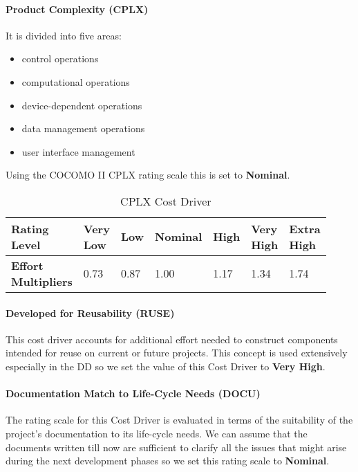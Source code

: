 \paragraph{Product Complexity (CPLX)} It is divided into five areas:
\begin{itemize}
	\item control operations
	\item computational operations
	\item device-dependent operations
	\item data management operations
	\item user interface management
\end{itemize}
Using the COCOMO II CPLX rating scale this is set to \textbf{Nominal}. 
\begin{table}[H]
	\centering
	\begin{tabular}{|M{0.165\linewidth}|M{0.125\linewidth}|M{0.125\linewidth}|M{0.125\linewidth}|M{0.125\linewidth}|M{0.125\linewidth}|M{0.125\linewidth}|}
		\hline
		\textbf{Rating Level} & Very Low & Low & Nominal & High & Very High & Extra High \\
		\hline
		\textbf{Effort Multipliers} & 0.73 & 0.87 & 1.00 & 1.17 & 1.34 & 1.74 \\
		\hline
	\end{tabular}
	\caption{CPLX Cost Driver}
\end{table}

\paragraph{Developed for Reusability (RUSE)} This cost driver accounts for additional effort needed to construct components intended for reuse on current or future projects. This concept is used extensively especially in the DD so we set the value of this Cost Driver to \textbf{Very High}.

\paragraph{Documentation Match to Life-Cycle Needs (DOCU)} The rating scale for this Cost Driver is evaluated in terms of the suitability of the project's documentation to its life-cycle needs. We can assume that the documents written till now are sufficient to clarify all the issues that might arise during the next development phases so we set this rating scale to \textbf{Nominal}.

